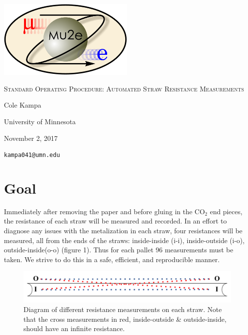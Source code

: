 \documentclass[letterpaper,12pt]{article}
\begin{document}
\begin{titlepage}
	\centering
	\includegraphics[width=0.5\textwidth]{mu2e_logo_oval.png}\par\vspace{2cm}
	{\scshape\LARGE Standard Operating Procedure: Automated Straw Resistance Measurements\par}
	\vspace{3cm}
	{\Large Cole Kampa\par}
	\vspace{3cm}
	{\large University of Minnesota\par}
 	\vspace{.5cm}
	{\large November 2, 2017\par}
	\vfill
	{\verb|kampa041@umn.edu|\par}
\end{titlepage}

\clearpage
\setcounter{page}{2}


\section{Goal}
Immediately after removing the paper and before gluing in the CO$_{2}$ end pieces, the resistance of each straw will be measured and recorded. In an effort to diagnose any issues with the metalization in each straw, four resistances will be measured, all from the ends of the straws: inside-inside (i-i), inside-outside (i-o), outside-inside(o-o) (figure 1). Thus for each pallet 96 measurements must be taken. We strive to do this in a safe, efficient, and reproducible manner.

\begin{figure}[h]
	\centering
	\includegraphics[width=\textwidth]{straw_meas_2}
	\caption{Diagram of different resistance measurements on each straw. Note that the cross measurements in red, inside-outside \& outside-inside, should have an infinite resistance.}
\end{figure}
\end{document}
